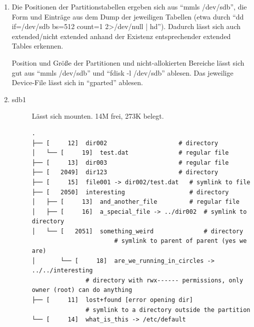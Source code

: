 \documentclass{article}
\begin{document}
\begin{enumerate}
    \item Die Positionen der Partitionstabellen ergeben sich aus \enquote{mmls /dev/sdb}, die Form und Eintr\"age aus dem Dump der jeweiligen Tabellen (etwa durch \enquote{dd if=/dev/sdb bs=512 count=1 2>/dev/null | hd}). Dadurch l\"asst sich auch extended/nicht extended anhand der Existenz entsprechender extended Tables erkennen.
    
    Position und Gr\"o{\ss}e der Partitionen und nicht-allokierten Bereiche l\"asst sich gut aus \enquote{mmls /dev/sdb} und \enquote{fdisk -l /dev/sdb} ablesen. Das jeweilige Device-File l\"asst sich in \enquote{gparted} ablesen.
    
    \begin{center}
    \end{center}

    \item \begin{description}
        \item[sdb1] L\"asst sich mounten. 14M frei, 273K belegt.
        \begin{verbatim}
.
├── [     12]  dir002                    # directory
│   └── [     19]  test.dat              # regular file
├── [     13]  dir003                    # regular file
├── [   2049]  dir123                    # directory
├── [     15]  file001 -> dir002/test.dat   # symlink to file
├── [   2050]  interesting                  # directory
│   ├── [     13]  and_another_file         # regular file
│   ├── [     16]  a_special_file -> ../dir002  # symlink to directory
│   └── [   2051]  something_weird              # directory
                       # symlink to parent of parent (yes we are)
│       └── [     18]  are_we_running_in_circles -> ../../interesting 
               # directory with rwx------ permissions, only owner (root) can do anything 
├── [     11]  lost+found [error opening dir]
               # symlink to a directory outside the partition
└── [     14]  what_is_this -> /etc/default
        \end{verbatim}


\end{description}
\end{enumerate}
\end{document}

